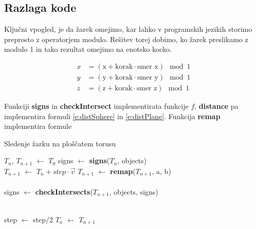 \documentclass[titlepage]{article}
\begin{document}
\subsection{Razlaga kode}
Ključni vpogled, je da žarek omejimo, kar lahko v programskih jezikih storimo preprosto z operatorjem modulo. Rešitev torej dobimo, ko žarek preslikamo z modulo 1 in tako rezultat omejimo na enotsko kocko.
        
\begin{align*}
x &= \left( \text{x} + \text{korak} \cdot \text{smer x} \right) \mod 1 \\
y &= \left( \text{y} + \text{korak} \cdot \text{smer y} \right) \mod 1 \\
z &= \left( \text{z} + \text{korak} \cdot \text{smer z} \right) \mod 1
\end{align*}


Funkciji \textbf{signs} in \textbf{checkIntersect} implementirata funkcije $f$, \textbf{distance} pa implementira formuli \eqref{e:distSphere} in 
\eqref{e:distPlane}. Funkcija \textbf{remap} implementira formule %
\begin{algorithm}
    \caption{Sledenje žarku na ploščatem torusu}
\begin{algorithmic}

    \State $T_{n}$, $T_{n+1}$ $\gets$ $T_{0}$
    \State signs $\gets$ \textbf{signs}($T_{n}$, objects)
    \\
      \State {}
      \State {}
    \EndIf
    \State $T_{n+1}$ $\gets$ $T_{n}+step \cdot \vec{v}$
    \State $T_{n+1}$ $\gets$ \textbf{remap}($T_{n+1}$, a, b)
    \\
    \\
    \State signs $\gets$ \textbf{checkIntersects}($T_{n+1}$, objects, signs)
    \\
    \\

        \State step $\gets$ step/2
    \Else
      \State $T_{n}$ $\gets$ $T_{n+1}$
    \EndIf
  \EndWhile
\EndFunction
\end{algorithmic}
\end{algorithm}
\end{document}
